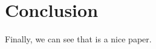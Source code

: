
\section{Conclusion}
\label{sec:Conclusion}

Finally, we can see that \cite{liuWang2013:agentTypesHLPE} is a nice paper.
